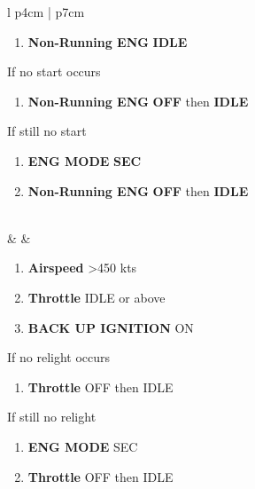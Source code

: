 \documentclass[8pt,usenames,dvipsnames,twoside]{article}
\begin{document}
\begin{center}
\begin{longtable}{l p{4cm} | p{7cm}}
\begin{minipage}[t]{\linewidth}
\begin{enumerate}[label=(\alph*)]
						\item \textbf{Non-Running ENG} \dotfill \textbf{IDLE}
					\end{enumerate}
					\vspace{-7pt}
					If no start occurs
					\begin{enumerate}[label=(\alph*), resume]
						\vspace{-7pt}
						\item \textbf{Non-Running ENG} \dotfill \textbf{OFF} then \textbf{IDLE}
					\end{enumerate}
					\vspace{-7pt}
					If still no start
					\begin{enumerate}[label=(\alph*), resume]
						\vspace{-7pt}
						\item \textbf{ENG MODE} \dotfill \textbf{SEC}
						\item \textbf{Non-Running ENG} \dotfill \textbf{OFF} then \textbf{IDLE}
					\end{enumerate}
				\end{minipage} \\
				\midrule
				\textbullet &  &
				\begin{minipage}[t]{\linewidth}
					\vspace{-7pt}
					\begin{enumerate}[label=(\alph*)]
						\item \textbf{Airspeed} \dotfill >450 kts
						\item \textbf{Throttle} \dotfill IDLE or above
						\item \textbf{BACK UP IGNITION} \dotfill ON
					\end{enumerate}
					\vspace{-7pt}
					If no relight occurs
					\begin{enumerate}[label=(\alph*), resume]
						\vspace{-7pt}
						\item \textbf{Throttle} \dotfill OFF then IDLE
					\end{enumerate}
					\vspace{-7pt}
					If still no relight
					\begin{enumerate}[label=(\alph*), resume]
						\vspace{-7pt}
						\item \textbf{ENG MODE} \dotfill SEC
						\item \textbf{Throttle} \dotfill OFF then IDLE
					\end{enumerate}

\end{minipage}
\end{longtable}
\end{center}
\end{document}
